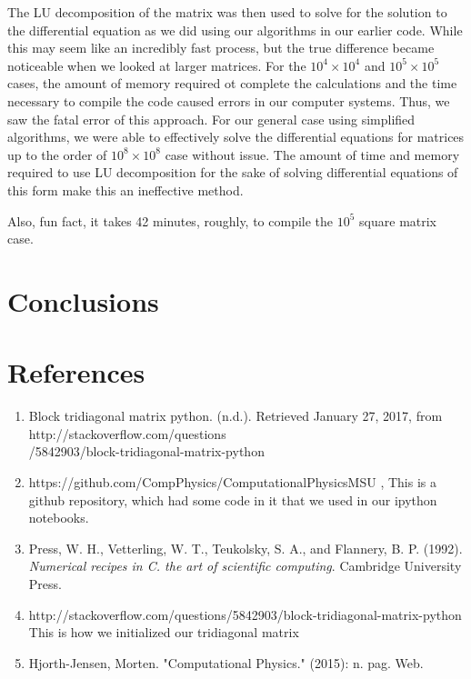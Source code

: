 \documentclass{article}
\begin{document}
The LU decomposition of the matrix was then used to solve for the solution to the differential equation as we did using our algorithms in our earlier code. While this may seem like an incredibly fast process, but the true difference became noticeable when we looked at larger matrices. For the $10^{4}\times 10^{4}$ and $10^{5}\times 10^{5}$ cases, the amount of memory required ot complete the calculations and the time necessary to compile the code caused errors in our computer systems. Thus, we saw the fatal error of this approach. For our general case using simplified algorithms, we were able to effectively solve the differential equations for matrices up to the order of $10^{8}\times 10^{8}$ case without issue. The amount of time and memory required to use LU decomposition for the sake of solving differential equations of this form make this an ineffective method. 

Also, fun fact, it takes 42 minutes, roughly, to compile the $10^{5}$ square matrix case.

\newpage
\section{Conclusions}


\section{References}
\begin{enumerate}
	\item  Block tridiagonal matrix python. (n.d.). Retrieved January 27, 2017, from http://stackoverflow.com/questions\\/5842903/block-tridiagonal-matrix-python
	
	\item https://github.com/CompPhysics/ComputationalPhysicsMSU , This is a github repository, which had some code in it that we used in our ipython notebooks.
	
	
	
	\item Press, W. H., Vetterling, W. T., Teukolsky, S. A., and Flannery, B. P. (1992). \textit{Numerical recipes in C. the art of scientific computing}. Cambridge University Press.
	
	\item http://stackoverflow.com/questions/5842903/block-tridiagonal-matrix-python
	This is how we initialized our tridiagonal matrix
	
	\item Hjorth-Jensen, Morten. "Computational Physics." (2015): n. pag. Web.
\end{enumerate}
\end{document}
